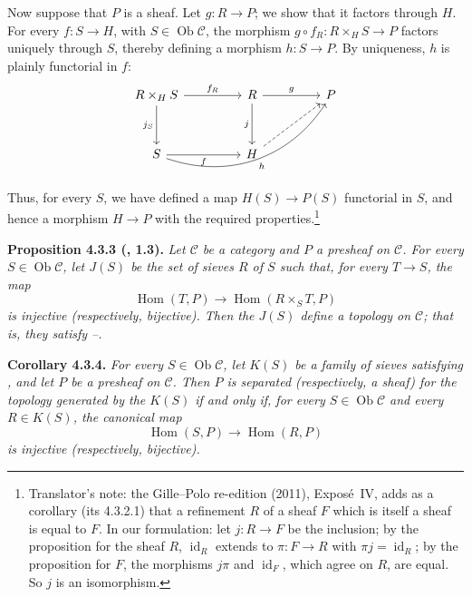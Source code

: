 Now suppose that \(P\) is a sheaf. Let \(g:R\to P\); we show that it
factors through \(H\). For every \(f:S\to H\), with
\(S\in\operatorname{Ob}\mathscr C\), the morphism
\(g\circ f_R:R\times_HS\to P\) factors uniquely through \(S\), thereby
defining a morphism \(h:S\to P\). By uniqueness, \(h\) is plainly functorial
in \(f\):
\[
\begin{tikzcd}[column sep=4.5em,row sep=3.1em]
 R\times_HS
   \arrow[r,"f_R"]
   \arrow[d,"j_S"']
 &
 R
   \arrow[r,"g"]
   \arrow[d,"j"']
 &
 P
 \\
 S
   \arrow[r,"f"']
   \arrow[rru,bend right=38,"h"']
 &
 H
   \arrow[ru,dashed]
 &
 {}
\end{tikzcd}
\]
Thus, for every \(S\), we have defined a map \(H(S)\to P(S)\) functorial
in \(S\), and hence a morphism \(H\to P\) with the required properties.\footnote{Translator's note: the Gille--Polo re-edition (2011), Expos\'e~IV, adds as a
corollary (its 4.3.2.1) that a refinement \(R\) of a sheaf \(F\) which is
itself a sheaf is equal to \(F\). In our formulation: let
\(j\colon R\to F\) be the inclusion; by the proposition for the sheaf \(R\),
\(\operatorname{id}_R\) extends to \(\pi\colon F\to R\) with
\(\pi j=\operatorname{id}_R\); by the proposition for \(F\), the morphisms
\(j\pi\) and \(\operatorname{id}_F\), which agree on \(R\), are equal. So
\(j\) is an isomorphism.}

\medskip
\noindent{}\textbf{Proposition 4.3.3 (, 1.3).}
\textit{Let \(\mathscr C\) be a category and \(P\) a presheaf on
\(\mathscr C\). For every \(S\in\operatorname{Ob}\mathscr C\), let
\(J(S)\) be the set of sieves \(R\) of \(S\) such that, for every
\(T\to S\), the map}
\[
\tag{+}\label{sga3:iv:proposition:4:3:3:eq:unnamed:01}
 \operatorname{Hom}(T,P)\longrightarrow
 \operatorname{Hom}(R\times_ST,P)
\]
\textit{is injective (respectively, bijective). Then the \(J(S)\) define a
topology on \(\mathscr C\); that is, they satisfy --.}

\medskip
\noindent{}\textbf{Corollary 4.3.4.}
\textit{For every \(S\in\operatorname{Ob}\mathscr C\), let \(K(S)\) be a
family of sieves satisfying , and let \(P\) be a presheaf on
\(\mathscr C\). Then \(P\) is separated (respectively, a sheaf) for the
topology generated by the \(K(S)\) if and only if, for every
\(S\in\operatorname{Ob}\mathscr C\) and every \(R\in K(S)\), the canonical
map}
\[
\tag{+}\label{sga3:iv:corollary:4:3:4:eq:unnamed:01}
 \operatorname{Hom}(S,P)\longrightarrow\operatorname{Hom}(R,P)
\]
\textit{is injective (respectively, bijective).}

